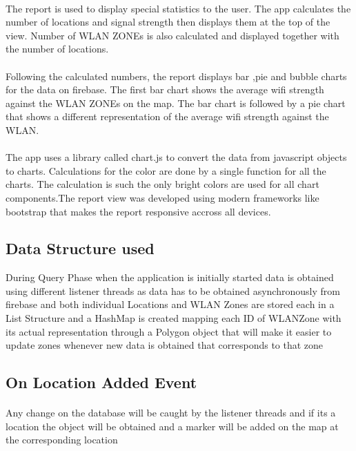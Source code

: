 \paragraph{}The report is used to display special statistics to the user. The app calculates the number of locations and signal strength then displays them at the top of the view. Number of WLAN ZONEs is also calculated and displayed together with the number of locations.

\paragraph{}Following the calculated numbers, the report displays bar ,pie and bubble charts for the data on firebase. The first bar chart shows the average wifi strength against the WLAN ZONEs on the map. The bar chart is followed by a pie chart that shows a different representation of the average wifi strength against the WLAN.

\paragraph{}The app uses a library called chart.js to convert the data from javascript objects to charts. Calculations for the color are done by a single function for all the charts. The calculation is such the only bright colors are used for all chart components.The report view was developed using modern frameworks like bootstrap that makes the report responsive accross all devices.

\subsection*{Data Structure used}

During Query Phase when the application is initially started data is obtained using different listener threads as data has to be obtained asynchronously from firebase and both individual Locations and WLAN Zones are stored each in a List Structure and a HashMap is created mapping each ID of WLANZone with its actual representation through a Polygon object that will make it easier to update zones whenever new data is obtained that corresponds to that zone 

\subsection*{On Location Added Event} 
\paragraph{}Any change on the database will be caught by the listener threads and if its a location the object will be obtained and a marker will be added on the map at the corresponding location      

